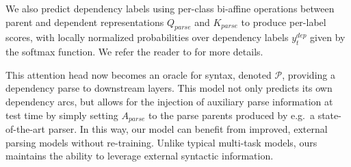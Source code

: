 \documentclass[11pt,a4paper]{article}
\newcommand{\todo}[1]{\textcolor{red}{TODO: #1}}
\begin{document}
We also predict dependency labels using per-class bi-affine operations between parent and dependent representations $Q_{parse}$ and $K_{parse}$ to produce per-label scores, with locally normalized probabilities over dependency labels $y_t^{dep}$ given by the softmax function. We refer the reader to \citet{dozat2017deep} for more details.

This attention head now becomes an oracle for syntax, denoted $\mathcal{P}$, providing a dependency parse to downstream layers. This model not only predicts its own dependency arcs, but allows for the injection of auxiliary parse information at test time by simply setting $A_{parse}$ to the parse parents produced by e.g.\ a state-of-the-art parser. In this way, our model can benefit from improved, external parsing models without re-training.
Unlike typical multi-task models, ours maintains the ability to leverage external syntactic information.


\end{document}
